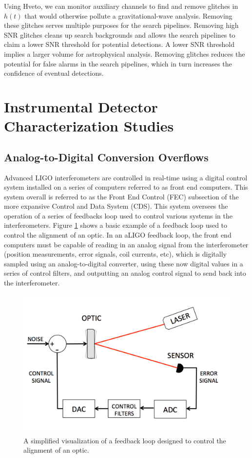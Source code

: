 Using Hveto, we can monitor auxiliary channels to find and remove glitches 
in $h(t)$ that would otherwise pollute a gravitational-wave analysis. Removing 
these glitches serves multiple purposes for the search pipelines. Removing 
high SNR glitches cleans up search backgrounds and allows the search 
pipelines to claim a lower SNR threshold for potential detections. A lower 
SNR threshold implies a larger volume for astrophysical analysis. Removing 
glitches reduces the potential for false alarms in the search pipelines, 
which in turn increases the confidence of eventual detections.

\section{Instrumental Detector Characterization Studies}

\subsection{Analog-to-Digital Conversion Overflows}

Advanced LIGO interferometers are controlled in real-time using a digital 
control system installed on a series of computers referred to as front end 
computers.  This system overall is referred to as the Front End Control 
(FEC) subsection of the more expansive Control and Data System (CDS). This 
system oversees the operation of a series of feedbacks loop used to control 
various systems in the interferometers.  
Figure \ref{fig:control-loop} shows a basic example of a feedback loop 
used to control the alignment of an optic. 
In an aLIGO feedback loop, the front end computers must be capable of reading in an 
analog signal from the interferometer (position measurements, error signals, 
coil currents, etc), which is digitally sampled using an 
analog-to-digital converter, using these now 
digital values in a series of control filters, and outputting an analog 
control signal to send back into the interferometer. 

\begin{figure}[ht!]
\includegraphics[width=\textwidth]{figures/detchar/control-loop}
\caption[Example of a feedback loop]{A simplified visualization of a feedback %
         loop designed to control the alignment of an optic.}
\label{fig:control-loop}
\end{figure}


